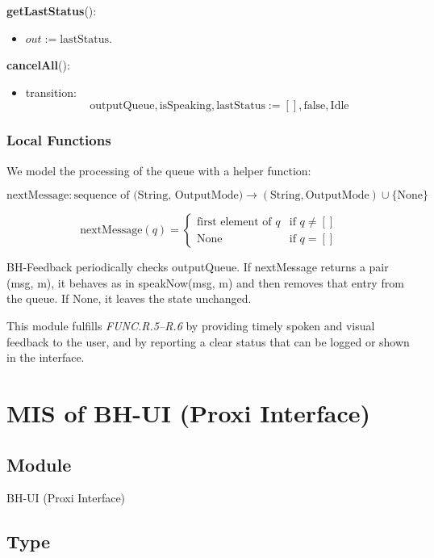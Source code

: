 \documentclass[12pt, titlepage]{article}
\begin{document}
\noindent
\textbf{getLastStatus}():
\begin{itemize}
  \item $out := \text{lastStatus}$.
\end{itemize}

\noindent
\textbf{cancelAll}():
\begin{itemize}
  \item transition:
  \[
    \text{outputQueue}, \text{isSpeaking}, \text{lastStatus}
    := [], \text{false}, \text{Idle}
  \]
\end{itemize}

\subsubsection{Local Functions}

\noindent
We model the processing of the queue with a helper function:

\[
  \text{nextMessage} :
  \text{sequence of (String, OutputMode)} \rightarrow
  (\text{String}, \text{OutputMode}) \cup \{\text{None}\}
\]

\[
  \text{nextMessage}(q) =
  \begin{cases}
    \text{first element of } q & \text{if } q \neq []\\
    \text{None} & \text{if } q = []
  \end{cases}
\]

\noindent
BH-Feedback periodically checks outputQueue. If nextMessage returns a
pair (msg, m), it behaves as in speakNow(msg, m) and then removes that
entry from the queue. If None, it leaves the state unchanged.

\noindent
This module fulfills \textit{FUNC.R.5–R.6} by providing timely spoken and visual
feedback to the user, and by reporting a clear status that can be logged or shown
in the interface.

\section{MIS of BH-UI (Proxi Interface)} \label{mod:BHUI}

\subsection{Module}

BH-UI (Proxi Interface)

\subsection{Type}
\end{document}

